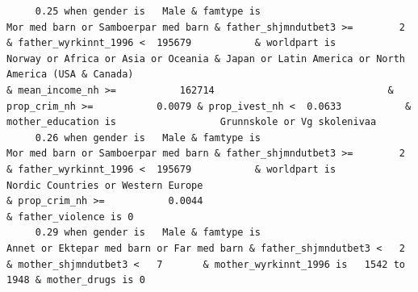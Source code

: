 \documentclass[
  letterpaper,
  DIV=11,
  numbers=noendperiod]{scrreprt}
\begin{document}
\begin{verbatim}
     0.25 when gender is   Male & famtype is                              Mor med barn or Samboerpar med barn & father_shjmndutbet3 >=        2 & father_wyrkinnt_1996 <  195679           & worldpart is                                        Norway or Africa or Asia or Oceania & Japan or Latin America or North America (USA & Canada)                                                                                                                                                          & mean_income_nh >=           162714                              & prop_crim_nh >=           0.0079 & prop_ivest_nh <  0.0633           & mother_education is                  Grunnskole or Vg skolenivaa                                                                                                                                                                     
     0.26 when gender is   Male & famtype is                              Mor med barn or Samboerpar med barn & father_shjmndutbet3 >=        2 & father_wyrkinnt_1996 <  195679           & worldpart is                                                                                                  Nordic Countries or Western Europe                                                                                                                                                                                                                            & prop_crim_nh >=           0.0044                                                                                                                                       & father_violence is 0                                                                                                               
     0.29 when gender is   Male & famtype is                        Annet or Ektepar med barn or Far med barn & father_shjmndutbet3 <   2                                                                                                                                                                                                     & mother_shjmndutbet3 <   7       & mother_wyrkinnt_1996 is   1542 to   1948 & mother_drugs is 0                                                                                                                                                                                                                                                                                                                                                                                                                                         

\end{verbatim}
\end{document}
